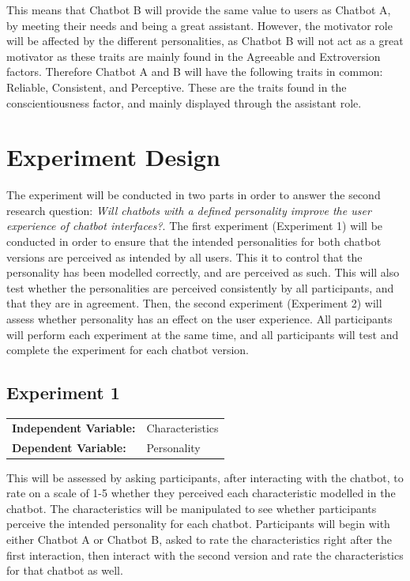     This means that Chatbot B will provide the same value to users as Chatbot A, by meeting their needs and being a great assistant. However, the motivator role will be affected by the different personalities, as Chatbot B will not act as a great motivator as these traits are mainly found in the Agreeable and Extroversion factors. Therefore Chatbot A and B will have the following traits in common: Reliable, Consistent, and Perceptive. These are the traits found in the conscientiousness factor, and mainly displayed through the assistant role.

\vspace{5mm} %
    
\section{Experiment Design}

The experiment will be conducted in two parts in order to answer the second research question: \textit{Will chatbots with a defined personality improve the user experience of chatbot interfaces?}. The first experiment (Experiment 1) will be conducted in order to ensure that the intended personalities for both chatbot versions are perceived as intended by all users. This it to control that the personality has been modelled correctly, and are perceived as such. This will also test whether the personalities are perceived consistently by all participants, and that they are in agreement. Then, the second experiment (Experiment 2) will assess whether personality has an effect on the user experience. All participants will perform each experiment at the same time, and all participants will test and complete the experiment for each chatbot version.

\subsection{Experiment 1}

\vspace{2,5mm}

\begin{tabular}{ l l }
    \textbf{Independent Variable:} & Characteristics \\ 
    \textbf{Dependent Variable:} & Personality \\  
\end{tabular}

\vspace{2,5mm}

This will be assessed by asking participants, after interacting with the chatbot, to rate on a scale of 1-5 whether they perceived each characteristic modelled in the chatbot. The characteristics will be manipulated to see whether participants perceive the intended personality for each chatbot. Participants will begin with either Chatbot A or Chatbot B, asked to rate the characteristics right after the first interaction, then interact with the second version and rate the characteristics for that chatbot as well.

